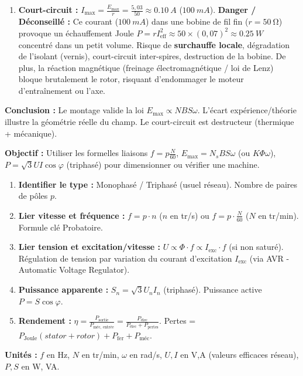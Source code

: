 \documentclass[11pt]{article}
\newcommand{\cle}[1]{{\popxbold\color{popdark}#1}}
\begin{document}
\begin{exoresolu}
\begin{enumerate}
    \item \textbf{Court-circuit :}
    $I_{\text{max}} = \frac{E_{\text{max}}}{r} = \frac{5,03}{50} \approx \SI{0,10}{A}$ ($\SI{100}{mA}$).
    \textbf{Danger / Déconseillé :} Ce courant ($\SI{100}{mA}$) dans une bobine de fil fin ($r=\SI{50}{\ohm}$) provoque un échauffement Joule $P = r I^2_{\text{eff}} \approx 50 \times (0,07)^2 \approx \SI{0,25}{W}$ concentré dans un petit volume. Risque de \textbf{surchauffe locale}, dégradation de l'isolant (vernis), court-circuit inter-spires, destruction de la bobine. De plus, la réaction magnétique (freinage électromagnétique / loi de Lenz) bloque brutalement le rotor, risquant d'endommager le moteur d'entraînement ou l'axe.
\end{enumerate}
\par\medskip\noindent\textbf{Conclusion :} Le montage valide la loi $E_{\text{max}} \propto N B S \omega$. L'écart expérience/théorie illustre la géométrie réelle du champ. Le court-circuit est destructeur (thermique + mécanique).
\end{exoresolu}

\begin{methode}
    \textbf{Objectif :} Utiliser les formelles liaisons $f = p \frac{N}{60}$, $E_{\text{max}} = N_s B S \omega$ (ou $K \Phi \omega$), $P = \sqrt{3} U I \cos\varphi$ (triphasé) pour dimensionner ou vérifier une machine.
    \begin{enumerate}
        \item \textbf{Identifier le type :} Monophasé / Triphasé (usuel réseau). Nombre de paires de pôles $p$.
        \item \textbf{Lier vitesse et fréquence :} $f = p \cdot n$ ($n$ en tr/s) ou $f = p \cdot \frac{N}{60}$ ($N$ en tr/min). \cle{Formule clé Probatoire}.
        \item \textbf{Lier tension et excitation/vitesse :} $U \propto \Phi \cdot f \propto I_{\text{exc}} \cdot f$ (si non saturé). Régulation de tension par variation du courant d'excitation $I_{\text{exc}}$ (via AVR - Automatic Voltage Regulator).
        \item \textbf{Puissance apparente :} $S_n = \sqrt{3} U_n I_n$ (triphasé). Puissance active $P = S \cos\varphi$.
        \item \textbf{Rendement :} $\eta = \frac{P_{\text{sortie}}}{P_{\text{méc, entrée}}} = \frac{P_{\text{élec}}}{P_{\text{élec}} + P_{\text{pertes}}}$. Pertes = $P_{\text{Joule}} (stator+rotor) + P_{\text{fer}} + P_{\text{méc}}$.
    \end{enumerate}
    \textbf{Unités :} $f$ en Hz, $N$ en tr/min, $\omega$ en rad/s, $U,I$ en V,A (valeurs efficaces réseau), $P,S$ en W, VA.
\end{methode}
\end{document}
